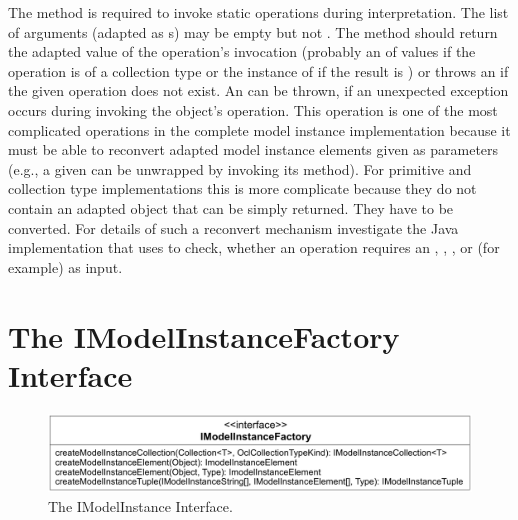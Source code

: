The method 
is required to invoke static operations during interpretation. The list of 
arguments (adapted as s) may be empty but
not . The method should return the adapted value of the operation's 
invocation (probably an  of values if the 
operation is of a collection type or the instance of 
if the result is ) or throws an 
 if the given operation does not 
exist. An  can be thrown, if an
unexpected exception occurs during invoking the object's operation. This operation is one 
of the most complicated operations in the complete model instance implementation
because it must be able to reconvert adapted model instance elements given as 
parameters (e.g., a given  can be unwrapped by 
invoking its  method). For primitive and collection type 
implementations this is more complicate because they do not contain an adapted 
object that can be simply returned. They have to be converted. For details of 
such a reconvert mechanism investigate the Java implementation that uses 
 to check, whether an operation requires an
, , , or  (for example) as input.



\section{The IModelInstanceFactory Interface}

\begin{figure}
	\centering
	\includegraphics[width=1.0\linewidth]{figures/modelInstanceTypeAdaptation/modelInstanceFactoryInterface}
	\caption{The IModelInstance Interface.}
	\label{pic:modelInstanceTypeAdaptation:modelInstanceFactoryInterface}
\end{figure}

